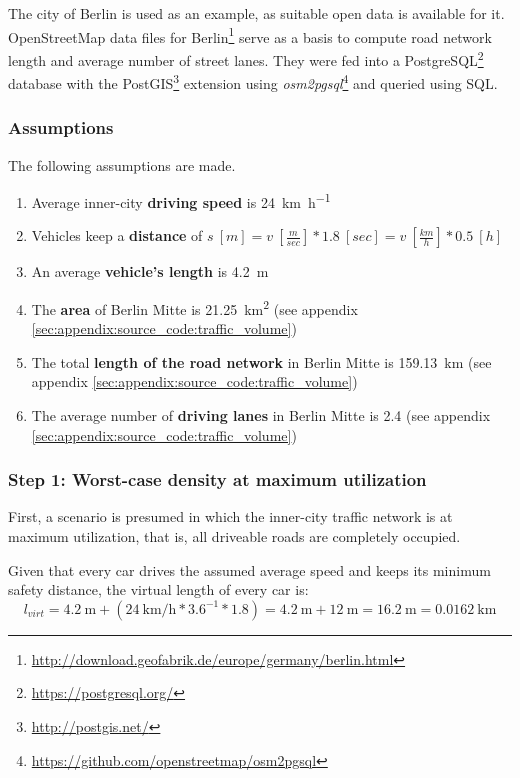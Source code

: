 The city of Berlin is used as an example, as suitable open data is available for it. OpenStreetMap data files for Berlin\footnote{\url{http://download.geofabrik.de/europe/germany/berlin.html}} serve as a basis to compute road network length and average number of street lanes. They were fed into a PostgreSQL\footnote{\url{https://postgresql.org/}} database with the PostGIS\footnote{\url{http://postgis.net/}} extension using \textit{osm2pgsql}\footnote{\url{https://github.com/openstreetmap/osm2pgsql}} and queried using SQL.

\subsubsection{Assumptions}
The following assumptions are made.

\begin{samepage}
\begin{enumerate}
	\item Average inner-city \textbf{driving speed} is \SI{24}{\kilo\meter\per\hour} \cite{Forbes2008}
	\item Vehicles keep a \textbf{distance} of $s \ [m] = v \ [\frac{m}{sec}] * 1.8 \ [sec] = v \  [\frac{km}{h}] * 0.5 \ [h]$ \cite{wiki:sicherheitsabstand}
	\item An average \textbf{vehicle's length} is \SI{4.2}{\meter}
	\item The \textbf{area} of Berlin Mitte is \SI{21.25}{\square\kilo\meter} (see appendix \cref{sec:appendix:source_code:traffic_volume})
	\item The total \textbf{length of the road network} in Berlin Mitte is \SI{159.13}{\kilo\meter} (see appendix \cref{sec:appendix:source_code:traffic_volume})
	\item The average number of \textbf{driving lanes} in Berlin Mitte is 2.4 (see appendix \cref{sec:appendix:source_code:traffic_volume})
\end{enumerate}
\end{samepage}

\subsubsection{Step 1: Worst-case density at maximum utilization}
First, a scenario is presumed in which the inner-city traffic network is at maximum utilization, that is, all driveable roads are completely occupied.

Given that every car drives the assumed average speed and keeps its minimum safety distance, the virtual length of every car is: $$l_{virt} = \SI{4.2}{\meter} + (\SI{24}{\kilo\meter\per\hour} * 3.6^{-1} * 1.8) = \SI{4.2}{\meter} + \SI{12}{\meter} = \SI{16.2}{\meter} = \SI{0.0162}{\km}$$

